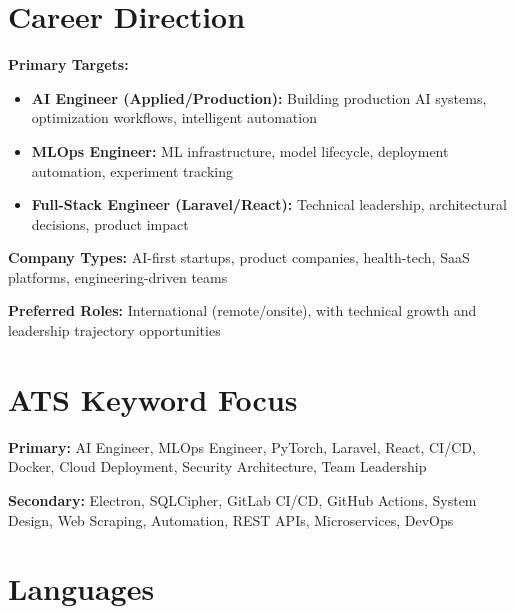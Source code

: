 \documentclass[11pt,a4paper]{article}
\begin{document}
\vspace{6pt}

\section{Career Direction}

\textbf{Primary Targets:}
\begin{itemize}
    \item \textbf{AI Engineer (Applied/Production):} Building production AI systems, optimization workflows, intelligent automation
    \item \textbf{MLOps Engineer:} ML infrastructure, model lifecycle, deployment automation, experiment tracking
    \item \textbf{Full-Stack Engineer (Laravel/React):} Technical leadership, architectural decisions, product impact
\end{itemize}

\vspace{4pt}

\textbf{Company Types:} AI-first startups, product companies, health-tech, SaaS platforms, engineering-driven teams

\vspace{4pt}

\textbf{Preferred Roles:} International (remote/onsite), with technical growth and leadership trajectory opportunities

\vspace{6pt}

\section{ATS Keyword Focus}

\textbf{Primary:} AI Engineer, MLOps Engineer, PyTorch, Laravel, React, CI/CD, Docker, Cloud Deployment, Security Architecture, Team Leadership

\vspace{3pt}

\textbf{Secondary:} Electron, SQLCipher, GitLab CI/CD, GitHub Actions, System Design, Web Scraping, Automation, REST APIs, Microservices, DevOps

\vspace{6pt}

\section{Languages}
\end{document}
